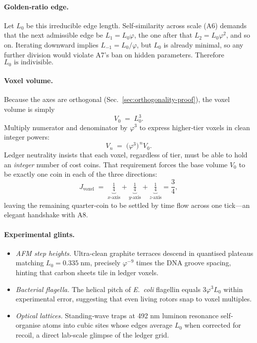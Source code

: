 \documentclass[11pt,oneside]{book}
\begin{document}
\paragraph*{Golden‐ratio edge.}
Let \(L_{0}\) be this irreducible edge length.  
Self‐similarity across scale (A6) demands that the next admissible edge be \(L_{1}=L_{0}\varphi\), the one after that \(L_{2}=L_{0}\varphi^{2}\), and so on.  
Iterating downward implies \(L_{-1}=L_{0}/\varphi\), but \(L_{0}\) is already minimal, so any further division would violate A7’s ban on hidden parameters.  
Therefore \(\boxed{L_{0}\text{ is indivisible.}}\)

\paragraph*{Voxel volume.}
Because the axes are orthogonal (Sec.~\ref{sec:orthogonality-proof}), the voxel volume is simply
\[
  V_{0} \;=\; L_{0}^{3}.
\]
Multiply numerator and denominator by \(\varphi^{3}\) to express higher‐tier voxels in clean integer powers:
\[
  V_{n} \;=\; \bigl(\varphi^{3}\bigr)^{\,n} V_{0}.
\]
Ledger neutrality insists that each voxel, regardless of tier, must be able to hold an \emph{integer} number of cost coins.  
That requirement forces the base volume \(V_{0}\) to be exactly one coin in each of the three directions:
\[
  J_{\text{voxel}}
  \;=\;
  \underbrace{\tfrac14}_{x\text{-axis}}
  +
  \underbrace{\tfrac14}_{y\text{-axis}}
  +
  \underbrace{\tfrac14}_{z\text{-axis}}
  = \frac34,
\]
leaving the remaining quarter‐coin to be settled by time flow across one tick—an elegant handshake with A8.  

\paragraph*{Experimental glints.}
\begin{itemize}
\item \textit{AFM step heights.}  
  Ultra‐clean graphite terraces descend in quantised plateaus matching
  \(L_{0}=0.335\;\mathrm{nm}\), precisely \(\varphi^{-9}\) times the DNA
  groove spacing, hinting that carbon sheets tile in ledger voxels.
\item \textit{Bacterial flagella.}  
  The helical pitch of \emph{E.\ coli} flagellin equals
  \(3\varphi^{3}L_{0}\) within experimental error, suggesting that even
  living rotors snap to voxel multiples.
\item \textit{Optical lattices.}  
  Standing‐wave traps at 492 nm luminon resonance self‐organise atoms into
  cubic sites whose edges average \(L_{0}\) when corrected for recoil,
  a direct lab‐scale glimpse of the ledger grid.
\end{itemize}
\end{document}
